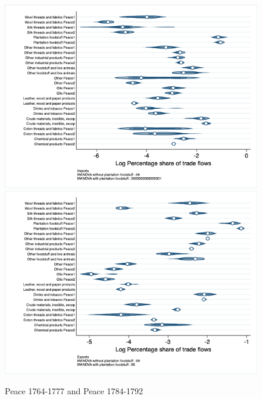 \documentclass[12pt,a4paper,notitlepage,english]{article}
\begin{document}
\begin{figure}
\centering
\caption{Peace 1764-1777 and Peace 1784-1792}
\label{seven_peace1764_1777_nat_distr_sitc}
\includegraphics[scale=.4]{peace1764_1777_peace1784_1792_nat_distr_Isitc}
\includegraphics[scale=.4]{peace1764_1777_peace1784_1792_nat_distr_Xsitc}
\end{figure}
\end{document}
